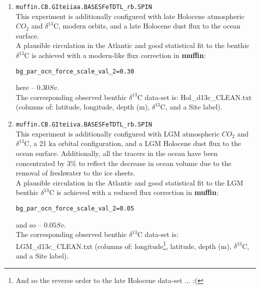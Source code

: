 \documentclass[11pt,fleqn]{book} %
\begin{document}
\begin{enumerate}[noitemsep]
\vspace{1mm}
\item \texttt{muffin.CB.GIteiiaa.BASESFeTDTL\_rb.SPIN}
\\This experiment is additionally configured with late Holocene atmospheric \(CO_{2}\) and $\delta^{13}$C, modern orbits, and a late Holocene dust flux to the ocean surface.
\\A plausible circulation in the Atlantic and good statistical fit to the benthic $\delta^{13}$C is achieved with a modern-like flux correction in \textbf{muffin}:
\vspace{-2mm}\begin{verbatim}
bg_par_ocn_force_scale_val_2=0.30
\end{verbatim}\vspace{-2mm}
here -- \(0.30 Sv\).
\\The corresponding observed benthic $\delta^{13}$C data-set is: \textsf{\footnotesize Hol\_d13c\_CLEAN.txt} (columns of: latitude, longitude, depth (m), $\delta^{13}$C, and a Site label).
\vspace{1mm}
\item \texttt{muffin.CB.GIteiiva.BASESFeTDTL\_rb.SPIN}
\\This experiment is additionally configured with LGM atmospheric \(CO_{2}\) and $\delta^{13}$C, a 21 ka orbital configuration, and a LGM Holocene dust flux to the ocean surface. Additionally, all the tracers in the ocean have been concentrated by 3\% to reflect the decrease in ocean volume due to the removal of freshwater to the ice sheets.
\\A plausible circulation in the Atlantic and good statistical fit to the LGM benthic $\delta^{13}$C is achieved with a reduced flux correction in \textbf{muffin}:
\vspace{-2mm}\begin{verbatim}
bg_par_ocn_force_scale_val_2=0.05
\end{verbatim}\vspace{-2mm}
and so -- \(0.05 Sv\).
\\The corresponding observed benthic $\delta^{13}$C data-set is: \textsf{\footnotesize LGM\_d13c\_CLEAN.txt} (columns of: longitude\footnote{And so the reverse order to the late Holocene data-set ... :(}, latitude, depth (m), $\delta^{13}$C, and a Site label).
\end{enumerate}
\vspace{1mm}
\end{document}
